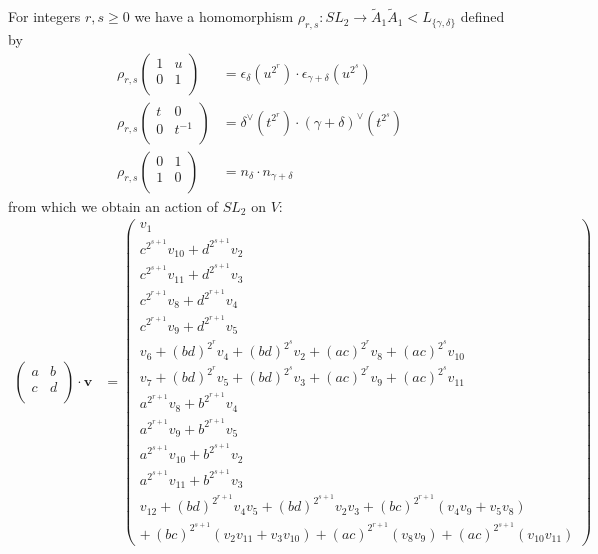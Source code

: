 For integers $r,s\geq 0$ we have a homomorphism $\rho_{r,s}:SL_2\rightarrow \widetilde{A}_1\widetilde{A}_1 < L_{\{\gamma,\delta\}}$ defined by
\begin{align*}
\rho_{r,s}   \left(\begin{matrix} %
      1 & u \\
      0 & 1 \\
   \end{matrix}\right) &= \epsilon_\delta(u^{2^r})\cdot\epsilon_{\gamma+\delta}(u^{2^s}) \\
\rho_{r,s}   \left(\begin{matrix} %
      t & 0 \\
      0 & t^{-1} \\
   \end{matrix}\right) &= \delta^\vee(t^{2^r})\cdot(\gamma+\delta)^\vee(t^{2^s}) \\
\rho_{r,s}   \left(\begin{matrix} %
      0 & 1 \\
      1 & 0 \\
   \end{matrix}\right) &= n_\delta\cdot n_{\gamma+\delta} 
\end{align*}
from which we obtain an action of $SL_2$ on $V$:
\begin{align*}
\left( \begin{matrix}
	      a & b \\
	      c & d \\
	   \end{matrix}\right) \cdot \mathbf{v} &=
	   \left( \begin{matrix}
	   v_1 \\
	   c^{2^{s+1}} v_{10} + d^{2^{s+1}}v_2 \\
	   c^{2^{s+1}} v_{11} + d^{2^{s+1}}v_3 \\
	   c^{2^{r+1}} v_{8} + d^{2^{r+1}}v_4 \\
	   c^{2^{r+1}} v_{9} + d^{2^{r+1}}v_5 \\
	   v_6 + (bd)^{2^r}v_4 + (bd)^{2^s}v_2 + (ac)^{2^r}v_8 + (ac)^{2^s}v_{10} \\
	   v_7 + (bd)^{2^r}v_5 + (bd)^{2^s}v_3 + (ac)^{2^r}v_9 + (ac)^{2^s}v_{11} \\
	   a^{2^{r+1}}v_8 + b^{2^{r+1}}v_4 \\
	   a^{2^{r+1}}v_9 + b^{2^{r+1}}v_5 \\
	   a^{2^{s+1}}v_{10} + b^{2^{s+1}}v_2 \\
	   a^{2^{s+1}}v_{11} + b^{2^{s+1}}v_3 \\
	   v_{12} + (bd)^{2^{r+1}}v_4v_5 + (bd)^{2^{s+1}}v_2v_3 + (bc)^{2^{r+1}}(v_4v_9 + v_5v_8)\\ +\, (bc)^{2^{s+1}}(v_2v_{11} + v_3v_{10}) + (ac)^{2^{r+1}}(v_8v_9) + (ac)^{2^{s+1}}(v_{10}v_{11})
	   \end{matrix} \right)
\end{align*}

